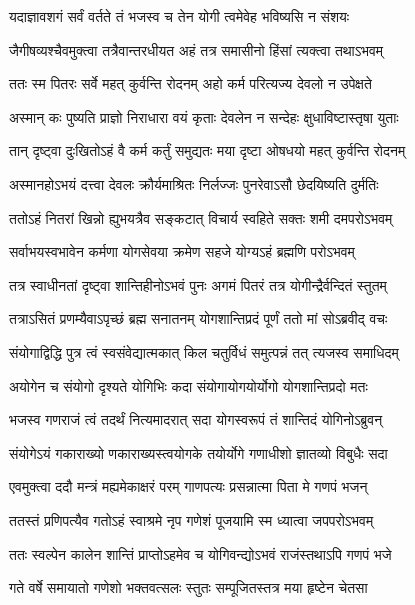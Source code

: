 \twolineshloka
{यदाज्ञावशगं सर्वं वर्तते तं भजस्व च}
{तेन योगी त्वमेवेह भविष्यसि न संशयः} %

\twolineshloka
{जैगीषव्यश्चैवमुक्त्वा तत्रैवान्तरधीयत}
{अहं तत्र समासीनो हिंसां त्यक्त्वा तथाऽभवम्} %

\twolineshloka
{ततः स्म पितरः सर्वे महत् कुर्वन्ति रोदनम्}
{अहो कर्म परित्यज्य देवलो न उपेक्षते} %

\twolineshloka
{अस्मान् कः पुष्यति प्राज्ञो निराधारा वयं कृताः}
{देवलेन न सन्देहः क्षुधाविष्टास्तृषा युताः} %

\twolineshloka
{तान् दृष्ट्वा दुःखितोऽहं वै कर्म कर्तुं समुद्यतः}
{मया दृष्टा ओषधयो महत् कुर्वन्ति रोदनम्} %

\twolineshloka
{अस्मानहोऽभयं दत्त्वा देवलः क्रौर्यमाश्रितः}
{निर्लज्जः पुनरेवाऽसौ छेदयिष्यति दुर्मतिः} %

\twolineshloka
{ततोऽहं नितरां खिन्नो ह्युभयत्रैव सङ्कटात्}
{विचार्य स्वहिते सक्तः शमी दमपरोऽभवम्} %

\twolineshloka
{सर्वाभयस्वभावेन कर्मणा योगसेवया}
{क्रमेण सहजे योग्यऽहं ब्रह्मणि परोऽभवम्} %

\twolineshloka
{तत्र स्वाधीनतां दृष्ट्वा शान्तिहीनोऽभवं पुनः}
{अगमं पितरं तत्र योगीन्द्रैर्वन्दितं स्तुतम्} %

\twolineshloka
{तत्राऽसितं प्रणम्यैवाऽपृच्छं ब्रह्म सनातनम्}
{योगशान्तिप्रदं पूर्णं ततो मां सोऽब्रवीद् वचः} %


\twolineshloka
{संयोगाद्विद्धि पुत्र त्वं स्वसंवेद्यात्मकात् किल}
{चतुर्विधं समुत्पन्नं तत् त्यजस्व समाधिदम्} %

\twolineshloka
{अयोगेन च संयोगो दृश्यते योगिभिः कदा}
{संयोगायोगयोर्योगो योगशान्तिप्रदो मतः} %

\twolineshloka
{भजस्व गणराजं त्वं तदर्थं नित्यमादरात्}
{सदा योगस्वरूपं तं शान्तिदं योगिनोऽब्रुवन्} %

\twolineshloka
{संयोगेऽयं गकाराख्यो णकाराख्यस्त्वयोगके}
{तयोर्योगे गणाधीशो ज्ञातव्यो विबुधैः सदा} %

\twolineshloka
{एवमुक्त्वा ददौ मन्त्रं मह्यमेकाक्षरं परम्}
{गाणपत्यः प्रसन्नात्मा पिता मे गणपं भजन्} %

\twolineshloka
{ततस्तं प्रणिपत्यैव गतोऽहं स्वाश्रमे नृप}
{गणेशं पूजयामि स्म ध्यात्वा जपपरोऽभवम्} %

\twolineshloka
{ततः स्वल्पेन कालेन शान्तिं प्राप्तोऽहमेव च}
{योगिवन्द्योऽभवं राजंस्तथाऽपि गणपं भजे} %

\twolineshloka
{गते वर्षे समायातो गणेशो भक्तवत्सलः}
{स्तुतः सम्पूजितस्तत्र मया हृष्टेन चेतसा} %

